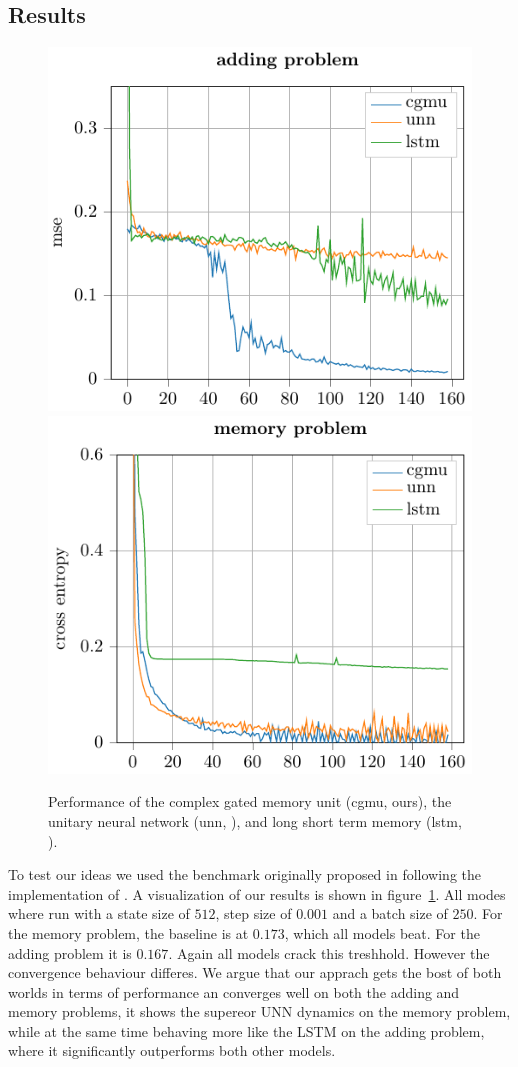 \documentclass{article}
\begin{document}
\subsection{Results}
\begin{figure}
\centering
%
\includegraphics[width=0.45\linewidth]{./img/cgmu/adding_problem.pdf}
%
\includegraphics[width=0.45\linewidth]{./img/cgmu/memory_problem.pdf}
\caption{Performance of the complex gated memory unit (cgmu, ours), the unitary neural network (unn, \cite{Arjovsky}), and long short term memory (lstm, \cite{Hochreiter}).}
\label{fig:montreal_eval}
\end{figure}
To test our ideas we used the benchmark originally proposed in \cite{Hochreiter} following the implementation of \cite{Arjovsky}. A visualization of our results is shown in figure~\ref{fig:montreal_eval}. All modes where run with a state size of $512$, step size of $0.001$ and a batch size of $250$. For the memory problem, the baseline is at $0.173$, which all models beat. For the adding problem it is $0.167$. Again all models crack this treshhold. However the convergence behaviour differes. We argue that our apprach gets the bost of both worlds in terms of performance an converges well on both the adding and memory problems, it shows the supereor UNN dynamics on the memory problem, while at the same time behaving more like the LSTM on the adding problem, where it significantly outperforms both other models.
\end{document}

